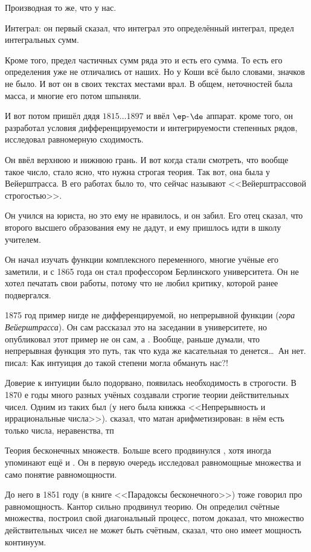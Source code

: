 \documentclass[a4paper,oneside,fleqn,10pt]{article}
\newcommand{\pe}[2]{${#1}\ldots{#2}$}
\begin{document}
Производная то же, что у нас.

Интеграл: он первый сказал, что интеграл это определённый интеграл,
предел интегральных сумм.

Кроме того, предел частичных сумм ряда это и есть его сумма. То есть его
определения уже не отличались от наших. Но у Коши всё было словами, значков не было.
И вот он в своих текстах местами врал. В общем, неточностей была масса, и многие
его потом шпыняли.

И вот потом пришёл дядя  \pe{1815}{1897} и ввёл $\ep$-$\de$ аппарат.
кроме того, он разработал условия дифференцируемости и интегрируемости степенных рядов,
исследовал равномерную сходимость.

Он ввёл верхнюю и нижнюю грань. И вот когда стали смотреть, что вообще такое число,
стало ясно, что нужна строгая теория. Так вот, она была у Вейерштрасса. В его работах было
то, что сейчас называют <<Вейерштрассовой строгостью>>.

Он учился на юриста, но это ему не нравилось, и он забил.
Его отец сказал, что второго высшего образования ему не дадут,
и ему пришлось идти в школу учителем.

Он начал изучать функции комплексного переменного, многие учёные его заметили,
и с 1865 года он стал профессором Берлинского университета. Он не хотел
печатать свои работы, потому что не любил критику, которой ранее подвергался.

1875 год пример нигде не дифференцируемой, но непрерывной функции (\emph{гора Вейерштрасса}).
Он сам рассказал это на заседании
в университете, но опубликовал этот пример не он сам, а .
Вообще, раньше думали, что непрерывная функция это путь, так что куда же
касательная то денется\ldots\ Ан нет.  писал: Как интуиция до такой степени могла обмануть нас?!

Доверие к интуиции было подорвано, появилась необходимость в строгости.
В 1870 е годы много разных учёных создавали строгие теории действительных чисел.
Одним из таких был  (у него была книжка <<Непрерывность и иррациональные числа>>).
 сказал, что матан арифметизирован: в нём есть только числа, неравенства, тп

Теория бесконечных множеств. Больше всего продвинулся , хотя иногда упоминают ещё
и . Он в первую очередь исследовал равномощные множества и само понятие равномощности.

До него в 1851 году  (в книге <<Парадоксы бесконечного>>) тоже говорил про равномощность.
Кантор сильно продвинул теорию. Он определил счётные множества,
построил свой диагональный процесс, потом доказал, что множество действительных чисел не может быть
счётным, сказал, что оно имеет мощность континуум.
\end{document}
